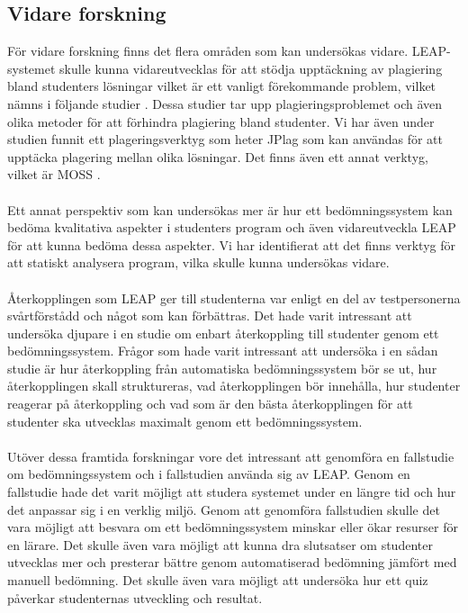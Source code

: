 \documentclass[a4paper,11pt]{article}
\begin{document}
{\subsection{Vidare forskning}

För vidare forskning finns det flera områden som kan undersökas vidare. LEAP-systemet skulle kunna vidareutvecklas för att stödja upptäckning av plagiering bland studenters lösningar vilket är ett vanligt förekommande problem, vilket nämns i följande studier \cite{joy_plagiarism_1999} \cite{kaya_plagiarism_2015} \cite{sufian_plagiarism_2010} \cite{rosales_plagiarism_2008} \cite{roboprof_4} \cite{ihantola}. Dessa studier tar upp plagieringsproblemet och även olika metoder för att förhindra plagiering bland studenter. Vi har även under studien funnit ett plageringsverktyg som heter JPlag \cite{jplag} som kan användas för att upptäcka plagering mellan olika lösningar. Det finns även ett annat verktyg, vilket är MOSS \cite{moss}.
\\
\\
Ett annat perspektiv som kan undersökas mer är hur ett bedömningssystem kan bedöma kvalitativa aspekter i studenters program och även vidareutveckla LEAP för att kunna bedöma dessa aspekter. Vi har identifierat att det finns verktyg för att statiskt analysera program, vilka skulle kunna undersökas vidare.
\\
\\
Återkopplingen som LEAP ger till studenterna var enligt en del av testpersonerna svårtförstådd och något som kan förbättras. Det hade varit intressant att undersöka djupare i en studie om enbart återkoppling till studenter genom ett bedömningssystem. Frågor som hade varit intressant att undersöka i en sådan studie är hur återkoppling från automatiska bedömningssystem bör se ut, hur återkopplingen skall struktureras, vad återkopplingen bör innehålla, hur studenter reagerar på återkoppling och vad som är den bästa återkopplingen för att studenter ska utvecklas maximalt genom ett bedömningssystem.
\\
\\
Utöver dessa framtida forskningar vore det intressant att genomföra en fallstudie om bedömningssystem och i fallstudien använda sig av LEAP. Genom en fallstudie hade det varit möjligt att studera systemet under en längre tid och hur det anpassar sig i en verklig miljö. Genom att genomföra fallstudien skulle det vara möjligt att besvara om ett bedömningssystem minskar eller ökar resurser för en lärare. Det skulle även vara möjligt att kunna dra slutsatser om studenter utvecklas mer och presterar bättre genom automatiserad bedömning jämfört med manuell bedömning. Det skulle även vara möjligt att undersöka hur ett quiz påverkar studenternas utveckling och resultat.

}
\end{document}

